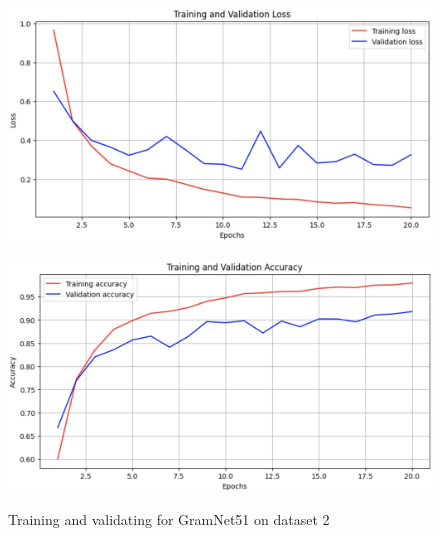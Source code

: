 \documentclass[rebuttal]{cvpr}
\begin{document}
\begin{figure}[t]
\centering
\begin{minipage}{0.45\linewidth}
   \includegraphics[width=\linewidth]{images/gramnet51_d2_loss.jpg}
   \label{fig:image1}
\end{minipage}
\hfill
\begin{minipage}{0.45\linewidth}
   \includegraphics[width=\linewidth]{images/gramnet51_d2_acc.jpg}
   \label{fig:image2}
\end{minipage}
\caption{Training and validating for GramNet51 on dataset 2}
\label{fig:gramnet51_d2}
\end{figure}
\end{document}
